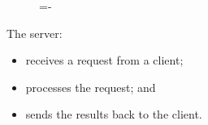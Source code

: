 \documentclass[a4paper]{systems-software}
\begin{document}
\begin{figure}[H]
	\lineskip=-\fboxrule
\end{figure}

The server:
\begin{itemize}
	\item receives a request from a client;
	\item processes the request; and
	\item sends the results back to the client.
\end{itemize}
\end{document}
